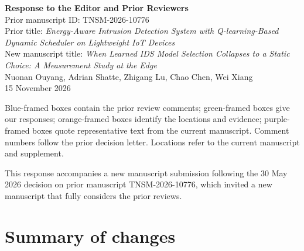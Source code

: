 \documentclass[10pt,a4paper]{article}
\newcommand{\paperid}{TNSM-2026-10776}
\begin{document}
\begin{center}
{\LARGE\bfseries Response to the Editor and Prior Reviewers}\\[6pt]
{\large Prior manuscript ID: \paperid}\\[4pt]
Prior title: \emph{Energy-Aware Intrusion Detection System with Q-learning-Based Dynamic Scheduler on Lightweight IoT Devices}\\
New manuscript title: \emph{When Learned IDS Model Selection Collapses to a Static Choice: A Measurement Study at the Edge}\\
\vspace{4pt}
Nuonan Ouyang, Adrian Shatte, Zhigang Lu, Chao Chen, Wei Xiang\\
15 November 2026
\end{center}

\begin{tcolorbox}[colback=SoftGray,colframe=black!25,title=How to Read This Letter]
Blue-framed boxes contain the prior review comments; green-framed boxes give our responses; orange-framed boxes identify the locations and evidence; purple-framed boxes quote representative text from the current manuscript. Comment numbers follow the prior decision letter. Locations refer to the current manuscript and supplement.
\end{tcolorbox}

\begin{tcolorbox}[colback=SoftGray,colframe=black!25,title=Note on This Submission]
This response accompanies a new manuscript submission following the 30 May 2026 decision on prior manuscript TNSM-2026-10776, which invited a new manuscript that fully considers the prior reviews.
\end{tcolorbox}

\section*{Summary of changes}
\end{document}
